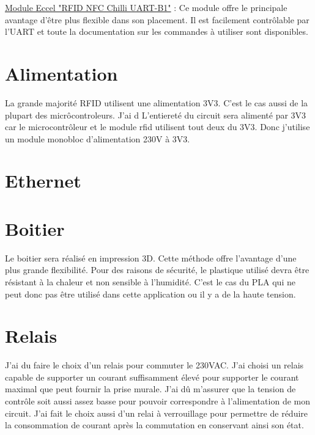 \vspace{5pt}
\href{https://www.mikroe.com/rfid-click}{Module Eccel "RFID NFC Chilli UART-B1"} : Ce module offre le principale avantage d'être plus flexible dans son placement. Il est facilement contrôlable par l'UART et toute la documentation sur les commandes à utiliser sont disponibles. 

\section{Alimentation}
La grande majorité RFID utilisent une alimentation 3V3. C'est le cas aussi de la plupart des micrôcontroleurs. J'ai d
L'entiereté du circuit sera alimenté par 3V3 car le microcontrôleur et le module rfid utilisent tout deux du 3V3. 
Donc j'utilise un module monobloc d'alimentation 230V à 3V3. 

\section{Ethernet}

\section{Boitier}
Le boitier sera réalisé en impression 3D. Cette méthode offre l'avantage d'une plus grande flexibilité.
Pour des raisons de sécurité, le plastique utilisé devra être résistant à la chaleur et non sensible à l'humidité. C'est le cas du PLA qui ne peut donc pas être utilisé dans cette application ou il y a de la haute tension.

\section{Relais}
J'ai du faire le choix d'un relais pour commuter le 230VAC. J'ai choisi un relais capable de supporter un courant suffisamment élevé pour supporter le courant maximal que peut fournir la prise murale. J'ai dû m'assurer que la tension de contrôle soit aussi assez basse pour pouvoir correspondre à l'alimentation de mon circuit.
J'ai fait le choix aussi d'un relai à verrouillage pour permettre de réduire la consommation de courant après la commutation en conservant ainsi son état.

